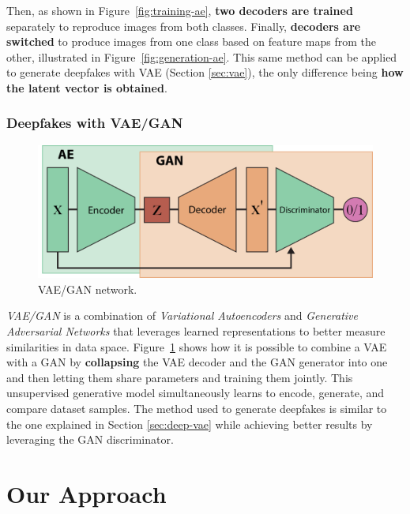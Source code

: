 \documentclass[preprint]{elsarticle}
\begin{document}
Then, as shown in Figure~\ref{fig:training-ae}, \textbf{two decoders are trained} separately to reproduce images from both classes. Finally, \textbf{decoders are switched} to produce images from one class based on feature maps from the other, illustrated in Figure~\ref{fig:generation-ae}. This same method can be applied to generate deepfakes with VAE (Section \ref{sec:vae}), the only difference being \textbf{how the latent vector is obtained}.



\subsubsection{Deepfakes with VAE/GAN}

\begin{figure}[b]
	\centering
    \includegraphics[scale=0.75]{img/svg/VaeGan.png}
	\caption{VAE/GAN network.}\label{fig:vae-gan}
\end{figure}


\emph{VAE/GAN} \cite{larsen2016autoencoding} is a combination of \emph{Variational Autoencoders} and \emph{Generative Adversarial Networks} that leverages learned representations to better measure similarities in data space. Figure~\ref{fig:vae-gan} shows how it is possible to combine a VAE with a GAN by \textbf{collapsing} the VAE decoder and the GAN generator  into one and then letting them share parameters and training them jointly.
This unsupervised generative model simultaneously learns to encode, generate, and compare dataset samples. 
The method used to generate deepfakes is similar to the one explained in Section \ref{sec:deep-vae} while achieving  better results by leveraging the GAN discriminator.



\section{Our Approach} \label{ch:project}
\end{document}
